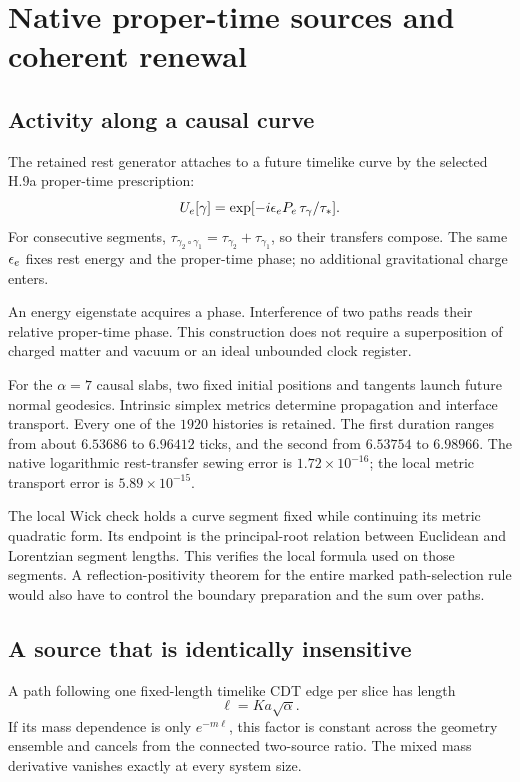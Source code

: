 \section{Native proper-time sources and coherent renewal}
\label{sec:clock}

\subsection{Activity along a causal curve}

The retained rest generator attaches to a future timelike curve by the selected H.9a proper-time prescription:
\begin{equation}
U_e[\gamma]=\exp[-i\epsilon_e P_e\,\tau_\gamma/\tau_*].
\end{equation}
For consecutive segments, $\tau_{\gamma_2\circ\gamma_1}=\tau_{\gamma_2}+\tau_{\gamma_1}$, so their transfers compose. The same $\epsilon_e$ fixes rest energy and the proper-time phase; no additional gravitational charge enters.

An energy eigenstate acquires a phase. Interference of two paths reads their relative proper-time phase. This construction does not require a superposition of charged matter and vacuum or an ideal unbounded clock register.

For the $\alpha=7$ causal slabs, two fixed initial positions and tangents launch future normal geodesics. Intrinsic simplex metrics determine propagation and interface transport. Every one of the $1920$ histories is retained. The first duration ranges from about $6.53686$ to $6.96412$ ticks, and the second from $6.53754$ to $6.98966$. The native logarithmic rest-transfer sewing error is $1.72\times10^{-16}$; the local metric transport error is $5.89\times10^{-15}$.

The local Wick check holds a curve segment fixed while continuing its metric quadratic form. Its endpoint is the principal-root relation between Euclidean and Lorentzian segment lengths. This verifies the local formula used on those segments. A reflection-positivity theorem for the entire marked path-selection rule would also have to control the boundary preparation and the sum over paths.

\subsection{A source that is identically insensitive}

A path following one fixed-length timelike CDT edge per slice has length
\begin{equation}
\ell=Ka\sqrt\alpha.
\end{equation}
If its mass dependence is only $e^{-m\ell}$, this factor is constant across the geometry ensemble and cancels from the connected two-source ratio. The mixed mass derivative vanishes exactly at every system size.

